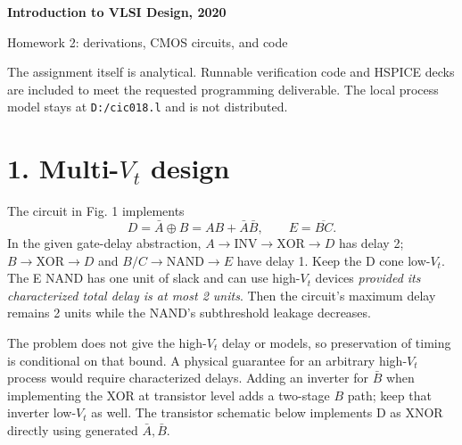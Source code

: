 \documentclass[11pt]{article}
\begin{document}
\begin{center}{\Large\bfseries Introduction to VLSI Design, 2020}\par{\large Homework 2: derivations, CMOS circuits, and code}\end{center}
The assignment itself is analytical. Runnable verification code and HSPICE decks are included to meet the requested programming deliverable. The local process model stays at \texttt{D:/cic018.l} and is not distributed.

\section*{1. Multi-$V_t$ design}
The circuit in Fig. 1 implements
\[
 D=\bar A\oplus B=AB+\bar A\bar B,\qquad E=\overline{BC}.
\]
In the given gate-delay abstraction, $A\to\text{INV}\to\text{XOR}\to D$ has delay 2; $B\to\text{XOR}\to D$ and $B/C\to\text{NAND}\to E$ have delay 1. Keep the D cone low-$V_t$. The E NAND has one unit of slack and can use high-$V_t$ devices \emph{provided its characterized total delay is at most 2 units}. Then the circuit's maximum delay remains 2 units while the NAND's subthreshold leakage decreases.

The problem does not give the high-$V_t$ delay or models, so preservation of timing is conditional on that bound. A physical guarantee for an arbitrary high-$V_t$ process would require characterized delays. Adding an inverter for $\bar B$ when implementing the XOR at transistor level adds a two-stage $B$ path; keep that inverter low-$V_t$ as well. The transistor schematic below implements D as XNOR directly using generated $\bar A,\bar B$.
\end{document}
